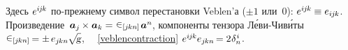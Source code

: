 \begin{otherlanguage}{russian}
\vspace{-0.2em}\noindent
Здесь ${e^{i\hspace{-0.1ex}j\hspace{-0.1ex}k}}$ по\hbox{-}прежнему символ перестановки Veblen’а (${\pm 1}$ или~$0$):
${e^{i\hspace{-0.1ex}j\hspace{-0.1ex}k} \hspace{-0.1ex} \equiv e_{i\hspace{-0.1ex}j\hspace{-0.1ex}k}}$.
Произведение~${\bm{a}_j \hspace{-0.1ex} \times \bm{a}_k = \hspace{.1ex} \permutationsparitysymbols{j\hspace{-0.1ex}kn} \hspace{.2ex} \bm{a}^n\hspace{-0.12ex}}$, компоненты тензора Л\'{е}ви\hbox{-\!}Чив\'{и}ты~${ \permutationsparitysymbols{j\hspace{-0.1ex}kn} \hspace{-0.2ex} = \pm \hspace{.33ex} e_{j\hspace{-0.1ex}kn} \hspace{-0.1ex} \sqrt{\hspace{-0.36ex}\mathstrut{\textsl{g}}} }$,
~~\eqref{veblencontraction} ${e^{i\hspace{-0.1ex}j\hspace{-0.1ex}k} e_{j\hspace{-0.1ex}kn} \hspace{-0.25ex} = 2 \hspace{.1ex} \delta_n^{\hspace{.1ex}i}}$.


\end{otherlanguage}
